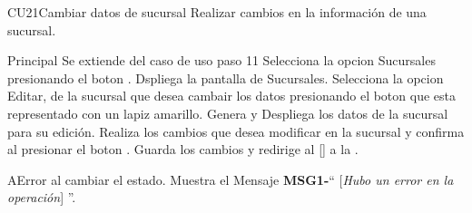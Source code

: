 \begin{UseCase}{CU21}{Cambiar datos de sucursal}{
		Realizar cambios en la información de una sucursal.
	}
	\end{UseCase}




	\begin{UCtrayectoria}{Principal}
		\UCpaso Se extiende del caso de uso  paso 11
		\UCpaso[\UCactor] Selecciona la opcion Sucursales presionando el boton .
		\UCpaso Dspliega la pantalla de Sucursales.
		\UCpaso[\UCactor] Selecciona la opcion Editar, de la sucursal que desea cambair los datos presionando el boton  que esta representado con un lapiz amarillo.
		\UCpaso Genera y Despliega los datos de la sucursal para su edición. 
		\UCpaso[\UCactor] Realiza los cambios que desea modificar en la sucursal y confirma al presionar el boton . 
		\UCpaso Guarda los cambios y redirige al [\UCactor] a la  .
	\end{UCtrayectoria}




\begin{UCtrayectoriaA}{A}{Error al cambiar el estado.}
			\UCpaso Muestra el Mensaje {\bf MSG1-}`` [{\em Hubo un error en la operación}] ''.
			
		\end{UCtrayectoriaA}

